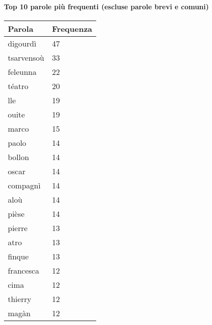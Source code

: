 
\paragraph*{Top 10 parole più frequenti (escluse parole brevi e comuni)}

\begin{tabular}{ll}
\toprule
\textbf{Parola} & \textbf{Frequenza} \\
\midrule
digourdì & 47 \\
tsarvensoù & 33 \\
feleunna & 22 \\
téatro & 20 \\
lle & 19 \\
ouite & 19 \\
marco & 15 \\
paolo & 14 \\
bollon & 14 \\
oscar & 14 \\
compagnì & 14 \\
aloù & 14 \\
pièse & 14 \\
pierre & 13 \\
atro & 13 \\
finque & 13 \\
francesca & 12 \\
cima & 12 \\
thierry & 12 \\
magàn & 12 \\
\bottomrule
\end{tabular}

